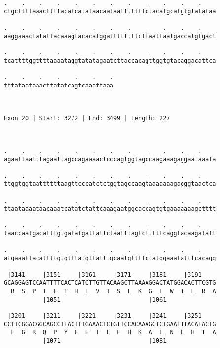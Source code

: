 \documentclass{article}
\begin{document}
\begin{Verbatim}
.    .    .    .    .    .    .    .    .    .    .    .    
ctgcttttaaacttttacatcatataacaataatttttttctacatgcatgtgtatataa
                                                            
.    .    .    .    .    .    .    .    .    .    .    .    
aaggaaactatattacaaagtacacatggattttttttcttaattaatgaccatgtgact
                                                            
.    .    .    .    .    .    .    .    .    .    .    .    
tcattttggttttaaaataggtatatagaatcttaccacagttggtgtacaggacattca
                                                            
.    .    .    .    .    .    .
tttataataaacttatatcagtcaaattaaa
                               
                               
 
Exon 20 | Start: 3272 | End: 3499 | Length: 227



.    .    .    .    .    .    .    .    .    .    .    .    
agaattaatttagaattagccagaaaactcccagtggtagccaagaaagaggaataaata
                                                            
.    .    .    .    .    .    .    .    .    .    .    .    
ttggtggtaattttttaagttcccatctctggtagccaagtaaaaaaagagggtaactca
                                                            
.    .    .    .    .    .    .    .    .    .    .    .    
ttaataaaataacaaatcatatctattcaaagaatggcaccagtgtgaaaaaaagctttt
                                                            
.    .    .    .    .    .    .    .    .    .    .    .    
taaccaatgacatttgtgatatgattattctaatttagtctttttcaggtacaagatatt
                                                            
.    .    .    .    .    .    .    .    .    .    .    .    
atgaaattacattttgtgtttatgttatttgcaatgttttctatggaaatatttcacagg
                                                            
 |3141     |3151     |3161     |3171     |3181     |3191    
GCAGGAGTCCAATTTTCACTCATCTTGTTACAAGCTTAAAAGGACTATGGACACTTCGTG
  R  S  P  I  F  T  H  L  V  T  S  L  K  G  L  W  T  L  R  A
           |1051                         |1061              
  
 |3201     |3211     |3221     |3231     |3241     |3251    
CCTTCGGACGGCAGCCTTACTTTGAAACTCTGTTCCACAAAGCTCTGAATTTACATACTG
  F  G  R  Q  P  Y  F  E  T  L  F  H  K  A  L  N  L  H  T  A
           |1071                         |1081              
  

\end{Verbatim}
\end{document}
